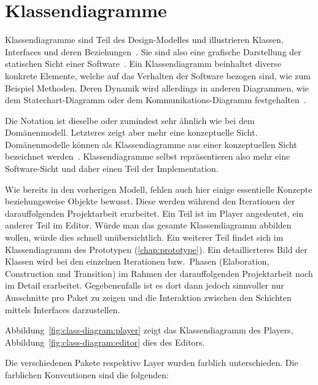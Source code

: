 
\section{Klassendiagramme}
\label{sec:class-diagrams}

Klassendiagramme sind Teil des Design-Modelles und illustrieren Klassen,
Interfaces und deren Beziehungen~\cite[S. 249 bis 251]{larman_applying_2004}.
Sie sind also eine grafische Darstellung der statischen Sicht einer
Software~\cite[S. 217]{rumbaugh_unified_2004}. Ein Klassendiagramm beinhaltet
diverse konkrete Elemente, welche auf das Verhalten der Software bezogen sind,
wie zum Beispiel Methoden. Deren Dynamik wird allerdings in anderen Diagrammen,
wie dem Statechart-Diagramm oder dem Kommunikations-Diagramm
festgehalten~\cite[S. 217]{rumbaugh_unified_2004}.

Die Notation ist dieselbe oder zumindest sehr ähnlich wie bei dem
Domänenmodell. Letzteres zeigt aber mehr eine konzeptuelle Sicht.
Domänenmodelle können als Klassendiagramme aus einer konzeptuellen Sicht
bezeichnet werden~\cite[S. 249]{larman_applying_2004}. Klassendiagramme selbst
repräsentieren also mehr eine Software-Sicht und daher einen Teil der
Implementation.

Wie bereits in den vorherigen Modell, fehlen auch hier einige essentielle
Konzepte beziehungsweise Objekte bewusst.  Diese werden während den Iterationen
der darauffolgenden Projektarbeit erarbeitet. Ein Teil ist im Player
angedeutet, ein anderer Teil im Editor. Würde man das gesamte Klassendiagramm
abbilden wollen, würde dies schnell unübersichtlich. Ein weiterer Teil findet
sich im Klassendiagramm des Prototypen (\ref{chap:prototype}). Ein
detaillierteres Bild der Klassen wird bei den einzelnen Iterationen bzw.\
Phasen (Elaboration, Construction und Transition) im Rahmen der darauffolgenden
Projektarbeit noch im Detail erarbeitet. Gegebenenfalls ist es dort dann jedoch
sinnvoller nur Ausschnitte pro Paket zu zeigen und die Interaktion zwischen den
Schichten mittels Interfaces darzustellen.

Abbildung~\ref{fig:class-diagram:player} zeigt das Klassendiagramm des
Players, Abbildung~\ref{fig:class-diagram:editor} dies des Editors.

Die verschiedenen Pakete respektive Layer wurden farblich unterschieden. Die
farblichen Konventionen sind die folgenden:

